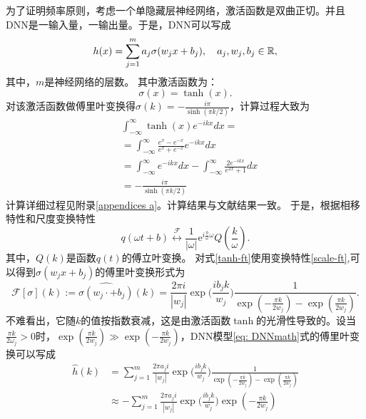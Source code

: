 为了证明频率原则，考虑一个单隐藏层神经网络，激活函数是双曲正切。并且DNN是一输入量，一输出量。于是，DNN可以写成
\begin{equation}
    h(x)=\sum_{j=1}^{m}a_{j}\sigma(w_{j}x+b_{j}),\quad a_{j},w_{j},b_{j}\in{\rm \mathbb{R}},\label{eq: DNNmath}
\end{equation}
其中，$m$是神经网络的层数。
其中激活函数为：
\begin{equation}\label{tanh}
    \sigma(x)=\tanh(x).
\end{equation}
对该激活函数做傅里叶变换得$\hat{\sigma}(k)=-\frac{i\pi}{\sinh(\pi k/2)}$\cite{bracewell1986fourier}，计算过程大致为
\begin{equation}\label{tanh-ft}
    \begin{aligned}
      &  \int_{-\infty }^{\infty } \tanh (x)e^{-ikx}dx= \\
&=\int_{-\infty}^{\infty} \frac{e^{x}-e^{-x}}{e^{x}+e^{-x}} e^{-i kx} d x \\
&=\int_{-\infty }^{\infty } e^{-ikx}dx-\int_{-\infty }^{\infty } \frac{2e^{-ikx}}{e^{2x}+1} dx \\
&=-\frac{i\pi}{\sinh(\pi k/2)}
\end{aligned}
\end{equation}
计算详细过程见附录\ref{appendices a}。计算结果与文献结果一致。
于是，根据相移特性和尺度变换特性\cite{刘树棠2010信号与系统}
\begin{equation}\label{scale-ft}
    q(\omega t+b) \stackrel{\mathcal{F}}{\longleftrightarrow} \frac{1}{|\omega|} \mathrm{e}^{i \frac{b}{\omega} \omega} Q\left(\frac{k}{\omega}\right).
\end{equation}
其中，$Q(k)$是函数$q(t)$的傅立叶变换。
对式\ref{tanh-ft}使用变换特性\ref{scale-ft},可以得到$\sigma(w_{j}x+b_{j})$的傅里叶变换形式为
\begin{equation}
    \mathcal{F}[\sigma](k):=\widehat{\sigma(w_{j}\cdot+b_{j})}(k)=\frac{2\pi i}{|w_{j}|}\exp\Big(\frac{i b_{j}k}{w_{j}}\Big)\frac{1}{\exp(-\frac{\pi k}{2w_{j}})-\exp(\frac{\pi k}{2w_{j}})}.\label{eq:FSigOri}
\end{equation}
不难看出，它随$k$的值按指数衰减，这是由激活函数$\tanh$的光滑性导致的。设当$\frac{\pi k}{2\omega_j}>0$时，$\exp(\frac{\pi k}{2w_{j}})\gg \exp(-\frac{\pi k}{2w_{j}})$，DNN模型\ref{eq: DNNmath}式的傅里叶变换可以写成
\begin{equation}
    \begin{aligned}
        \hat{h}(k)&=\sum_{j=1}^{m}\frac{2\pi a_{j}i}{|w_{j}|}\exp\Big(\frac{i b_{j}k}{w_{j}}\Big)\frac{1}{\exp(-\frac{\pi k}{2w_{j}})-\exp(\frac{\pi k}{2w_{j}})} \\
& \approx -\sum_{j=1}^{m}\frac{2\pi a_{j}i}{|w_{j}|}\exp\Big(\frac{i b_{j}k}{w_{j}}\Big)\exp(-\frac{\pi k}{2w_{j}})
\end{aligned}
\end{equation}
